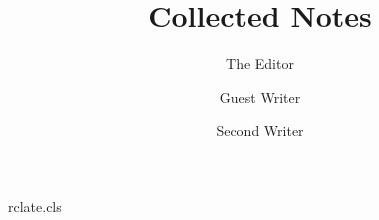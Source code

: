 \begin{filecontents*}[overwrite]{rclate.cls}
\newif\if@rcbody \AtBeginDocument{\@rcbodytrue}
\renewcommand\author[1]{\gdef\@author{#1}\if@rcbody\par\noindent\textit{#1}\par\fi}
\renewcommand\maketitle{\begin{center}\Large\@title\end{center}}
\end{filecontents*}
\documentclass{rclate}
\title{Collected Notes}\author{The Editor}

\maketitle
\section{One}
\author{Guest Writer}
Text.
\section{Two}
\author{Second Writer}
More text.


